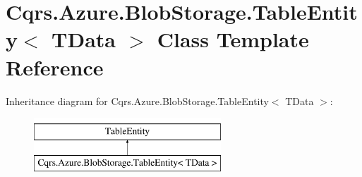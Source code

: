 \hypertarget{classCqrs_1_1Azure_1_1BlobStorage_1_1TableEntity}{}\section{Cqrs.\+Azure.\+Blob\+Storage.\+Table\+Entity$<$ T\+Data $>$ Class Template Reference}
\label{classCqrs_1_1Azure_1_1BlobStorage_1_1TableEntity}
Inheritance diagram for Cqrs.\+Azure.\+Blob\+Storage.\+Table\+Entity$<$ T\+Data $>$\+:\begin{figure}[H]
\begin{center}
\leavevmode
\includegraphics[height=2.000000cm]{classCqrs_1_1Azure_1_1BlobStorage_1_1TableEntity}
\end{center}
\end{figure}
